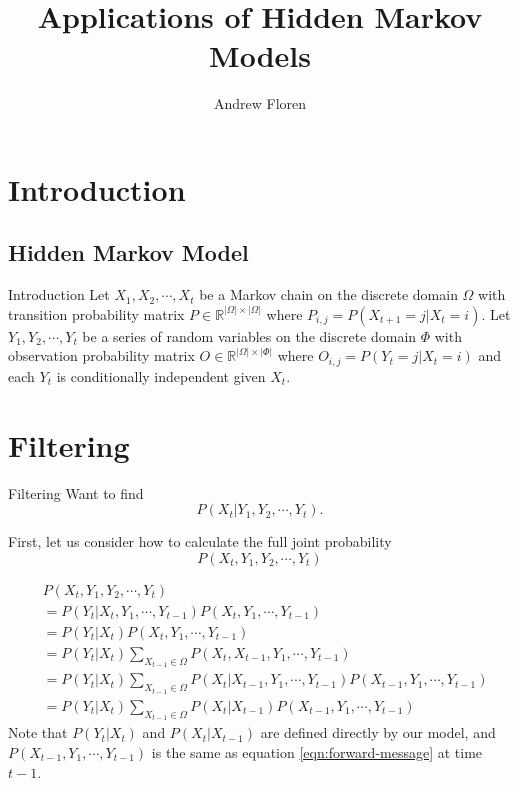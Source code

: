 \documentclass{beamer}
\title{Applications of Hidden Markov Models}
\author{Andrew Floren}
\begin{document}
\begin{frame}
\titlepage
\end{frame}

\section*{Introduction}
\subsection*{Hidden Markov Model}
\begin{frame}{Introduction}
Let $X_1, X_2, \cdots, X_t$ be a Markov chain on the discrete domain $\Omega$ with transition probability matrix $P \in \mathbb{R}^{|\Omega| \times |\Omega|} $ where $P_{i,j} = P(X_{t+1} = j | X_{t} = i)$. Let $Y_1, Y_2, \cdots, Y_t$ be a series of random variables on the discrete domain $\Phi$ with observation probability matrix $O \in \mathbb{R}^{|\Omega| \times |\Phi|}$ where $O_{i,j} = P(Y_t = j | X_t = i)$ and each $Y_t$ is conditionally independent given $X_t$.
\end{frame}

\section{Filtering}
\begin{frame}{Filtering}
Want to find
\begin{equation}
\label{eqn:filtering}
P(X_t | Y_1, Y_2, \cdots, Y_t).
\end{equation}
\end{frame}

\begin{frame}
First, let us consider how to calculate the full joint probability 
\begin{equation}
P(X_{t}, Y_{1}, Y_{2}, \cdots, Y_t)
\end{equation}
\end{frame}

\begin{frame}
\begin{align}
&P(X_{t}, Y_{1}, Y_{2}, \cdots, Y_t)  \label{eqn:forward-message}\\
&= P(Y_{t} | X_{t}, Y_{1}, \cdots, Y_{t-1}) P(X_{t}, Y_{1}, \cdots, Y_{t-1}) \\ 
&= P(Y_{t} | X_{t}) P(X_{t}, Y_{1}, \cdots, Y_{t-1}) \\
&= P(Y_{t} | X_{t}) \sum_{X_{t-1} \in \Omega}{P(X_{t}, X_{t-1}, Y_{1}, \cdots, Y_{t-1})} \\
&= P(Y_{t} | X_{t}) \sum_{X_{t-1} \in \Omega}{P(X_{t} | X_{t-1}, Y_{1}, \cdots, Y_{t-1}) P(X_{t-1}, Y_{1}, \cdots, Y_{t-1})} \\
&= P(Y_{t} | X_{t}) \sum_{X_{t-1} \in \Omega}{P(X_{t} | X_{t-1})P(X_{t-1}, Y_{1}, \cdots, Y_{t-1})}
\end{align}
Note that $P(Y_{t} | X_{t})$ and $P(X_{t} | X_{t-1})$ are defined directly by our model, and $P(X_{t-1}, Y_{1}, \cdots, Y_{t-1})$ is the same as equation \ref{eqn:forward-message} at time $t-1$.
\end{frame}
\end{document}

